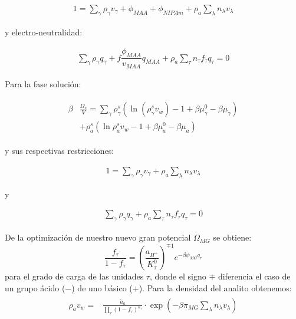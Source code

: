 \begin{align}
	1 = \sum_{\gamma } \rho_\gamma v_\gamma  + \phi_{MAA} + \phi_{NIPAm} + \rho_a \sum_\lambda n_\lambda v_\lambda
	\label{eq:gel:packing-g-total}
\end{align}

y electro-neutralidad:

\begin{align}
	\sum_{\gamma } {\rho_\gamma q_\gamma + f\dfrac{\phi_{MAA}}{v_{MAA}}q_{MAA}} + \rho_a \sum_\tau n_\tau f_\tau q_\tau = 0
\end{align}

Para la fase soluci\'on:

\begin{align}
	\begin{aligned}
		\beta&\frac{\Omega_s}{V}= \sum_{\gamma   } {\rho^s_\gamma\left(\ln(\rho_\gamma^sv_w) -1 + \beta\mu_\gamma^0 - \beta\mu_\gamma\right)} \\
		& + \rho^s_a \left( \ln \rho^s_a v_w -1 +\beta\mu^0_a - \beta\mu_a\right)
	\end{aligned}
	\label{eq:gel:bulk-total}
\end{align}

y sus respectivas restricciones:

\begin{align}
	1 = \sum_{\gamma } \rho_\gamma v_\gamma  + \rho_a \sum_\lambda n_\lambda v_\lambda
\end{align}

y 

\begin{align}
	\sum_\gamma \rho_\gamma q_\gamma + \rho_a \sum_\tau n_\tau f_\tau q_\tau = 0
	\label{eq:gel:bulk-neu-total}
\end{align}



De la optimizaci\'on de nuestro nuevo gran potencial $\Omega_{MG}$  se obtiene:
%
\begin{equation}
\frac{f_\tau}{1-f_\tau}=\left(\frac{a_{H^+}}{K^0_\tau}\right)^{\mp 1} e^{-\beta \psi_{MG} q_\tau}
\label{eq:gel:f_ads}
\end{equation}
%
\noindent para el grado de carga de las unidades $\tau$, donde el signo $\mp$ diferencia el caso de un grupo \'acido ($-$) de uno b\'asico ($+$).
Para la densidad del analito obtenemos:
%
\begin{align}
    \begin{aligned}
   \rho_a v_w =&\frac{ \tilde{a}_a}{\prod_\tau \left(1-f_\tau\right)^{n_\tau}} \cdot\exp{\left(-\beta \pi_{MG} \sum_\lambda n_\lambda v_\lambda \right)} 
	\label{eq:gel:rho_ads}
    \end{aligned}
\end{align}
%

